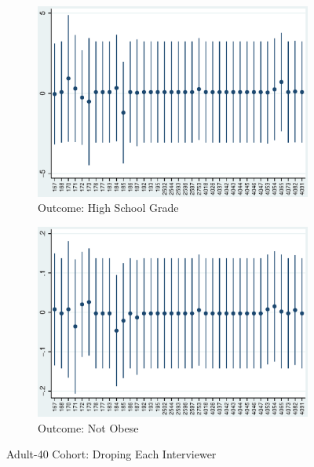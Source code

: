     \begin{figure}[H]
      \centering
        \begin{subfigure}[t]{0.81\textwidth}
          \includegraphics[width=\textwidth]{../../../output/image/coef-interviewer-adult40-votoMaturita.eps}       
\caption{Outcome: High School Grade}        
        \end{subfigure}
        \begin{subfigure}[t]{0.81\textwidth}
          \includegraphics[width=\textwidth]{../../../output/image/coef-interviewer-adult40-BMI_obese.eps}       
 \caption{Outcome: Not Obese}        
        \end{subfigure}
      \caption{Adult-40 Cohort: Droping Each Interviewer}  \label{fig:adult40-sensitivity-interviewer}
    \end{figure}







